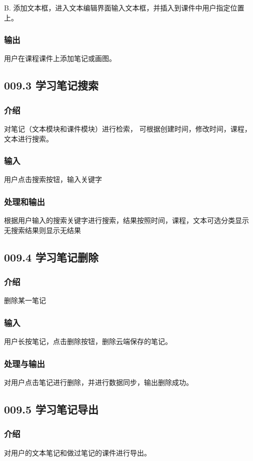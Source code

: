 	B. 添加文本框，进入文本编辑界面输入文本框，并插入到课件中用户指定位置上。
    \subsubsection{输出}
	用户在课程课件上添加笔记或画图。

 \subsection{009.3 学习笔记搜索}
    \subsubsection{介绍}
	对笔记（文本模块和课件模块）进行检索，
可根据创建时间，修改时间，课程，文本进行搜索。
    \subsubsection{输入}
	用户点击搜索按钮，输入关键字
    \subsubsection{处理和输出}
	根据用户输入的搜索关键字进行搜索，结果按照时间，课程，文本可选分类显示
无搜索结果则显示无结果

 \subsection{009.4 学习笔记删除}
    \subsubsection{介绍}
	删除某一笔记
    \subsubsection{输入}
	用户长按笔记，点击删除按钮，删除云端保存的笔记。
    \subsubsection{处理与输出}
	对用户点击笔记进行删除，并进行数据同步，输出删除成功。
    

 \subsection{009.5 学习笔记导出}
    \subsubsection{介绍}
	对用户的文本笔记和做过笔记的课件进行导出。
